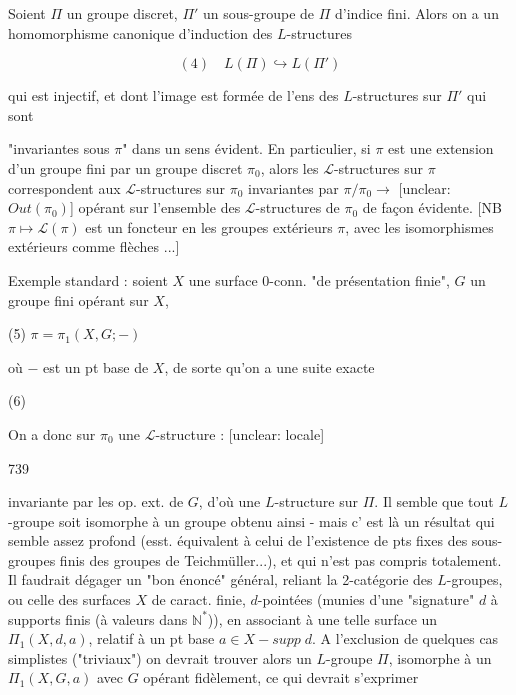 Soient $\Pi$ un groupe discret, $\Pi'$ un sous-groupe de $\Pi$ d'indice fini. Alors on a un homomorphisme canonique d'induction des $L$-structures

$$(4) \quad L(\Pi) \hookrightarrow L(\Pi')$$

qui est injectif, et dont l'image est formée de l'ens des $L$-structures sur $\Pi'$ qui sont

\newpage


"invariantes sous $\pi$" dans un sens évident.
En particulier, si $\pi$ est une extension
d'un groupe fini par un groupe
discret $\pi_0$, alors les $\mathcal{L}$-structures sur
$\pi$ correspondent aux $\mathcal{L}$-structures
sur $\pi_0$ invariantes par $\pi / \pi_0 \to$ [unclear: $Out(\pi_0)$]
opérant sur l'ensemble des $\mathcal{L}$-structures de $\pi_0$
de façon évidente. [NB $\pi \mapsto \mathcal{L}(\pi)$ est
un foncteur en les groupes extérieurs
$\pi$, avec les isomorphismes extérieurs
comme flèches ...]

Exemple standard : soient $X$ une
surface 0-conn. "de présentation finie",
$G$ un groupe fini opérant sur $X$,

(5) $\pi = \pi_1(X, G ; -)$

où $-$ est un pt base de $X$, de
sorte qu'on a une suite exacte

(6) 

On a donc sur $\pi_0$ une $\mathcal{L}$-structure : [unclear: locale]

\newpage


739

invariante par les op. ext. de $G$, d'où
une $L$-structure sur $\Pi$. Il semble
que tout $L$-groupe soit isomorphe à
un groupe obtenu ainsi - mais c'
est là un résultat qui semble
assez profond (esst. équivalent à celui de l'existence
de pts fixes des sous-groupes finis des groupes
de Teichmüller...), et qui n'est
pas compris totalement. Il faudrait
dégager un "bon énoncé" général, reliant la
2-catégorie des $L$-groupes, ou celle des
surfaces $X$ de caract. finie, $d$-pointées
(munies d'une "signature" $d$ à supports
finis (à valeurs dans $\mathbb{N}^*$)), en associant à
une telle surface un $\Pi_1(X, d, a)$,
relatif à un pt base $a \in X - supp \; d$.
A l'exclusion de quelques cas simplistes ("triviaux") on
devrait trouver alors un $L$-groupe $\Pi$,
isomorphe à un $\Pi_1(X, G, a)$ avec $G$
opérant fidèlement, ce qui devrait s'exprimer

